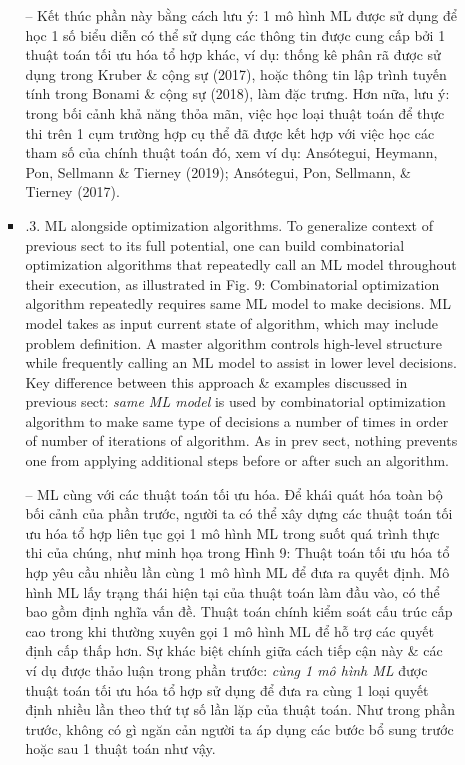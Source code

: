 \documentclass{article}
\begin{document}
\begin{itemize}
\begin{itemize}
\begin{itemize}
            -- Kết thúc phần này bằng cách lưu ý: 1 mô hình ML được sử dụng để học 1 số biểu diễn có thể sử dụng các thông tin được cung cấp bởi 1 thuật toán tối ưu hóa tổ hợp khác, ví dụ: thống kê phân rã được sử dụng trong Kruber \& cộng sự (2017), hoặc thông tin lập trình tuyến tính trong Bonami \& cộng sự (2018), làm đặc trưng. Hơn nữa, lưu ý: trong bối cảnh khả năng thỏa mãn, việc học loại thuật toán để thực thi trên 1 cụm trường hợp cụ thể đã được kết hợp với việc học các tham số của chính thuật toán đó, xem ví dụ: Ansótegui, Heymann, Pon, Sellmann \& Tierney (2019); Ansótegui, Pon, Sellmann, \& Tierney (2017).
            \item {.3. ML alongside optimization algorithms.} To generalize context of previous sect to its full potential, one can build combinatorial optimization algorithms that repeatedly call an ML model throughout their execution, as illustrated in {\sf Fig. 9: Combinatorial optimization algorithm repeatedly requires same ML model to make decisions. ML model takes as input current state of algorithm, which may include problem definition.} A master algorithm controls high-level structure while frequently calling an ML model to assist in lower level decisions. Key difference between this approach \& examples discussed in previous sect: {\it same ML model} is used by combinatorial optimization algorithm to make same type of decisions a number of times in order of number of iterations of algorithm. As in prev sect, nothing prevents one from applying additional steps before or after such an algorithm.

            -- {\sf ML cùng với các thuật toán tối ưu hóa.} Để khái quát hóa toàn bộ bối cảnh của phần trước, người ta có thể xây dựng các thuật toán tối ưu hóa tổ hợp liên tục gọi 1 mô hình ML trong suốt quá trình thực thi của chúng, như minh họa trong {\sf Hình 9: Thuật toán tối ưu hóa tổ hợp yêu cầu nhiều lần cùng 1 mô hình ML để đưa ra quyết định. Mô hình ML lấy trạng thái hiện tại của thuật toán làm đầu vào, có thể bao gồm định nghĩa vấn đề.} Thuật toán chính kiểm soát cấu trúc cấp cao trong khi thường xuyên gọi 1 mô hình ML để hỗ trợ các quyết định cấp thấp hơn. Sự khác biệt chính giữa cách tiếp cận này \& các ví dụ được thảo luận trong phần trước: {\it cùng 1 mô hình ML} được thuật toán tối ưu hóa tổ hợp sử dụng để đưa ra cùng 1 loại quyết định nhiều lần theo thứ tự số lần lặp của thuật toán. Như trong phần trước, không có gì ngăn cản người ta áp dụng các bước bổ sung trước hoặc sau 1 thuật toán như vậy.


\end{itemize}
\end{itemize}
\end{itemize}
\end{document}
